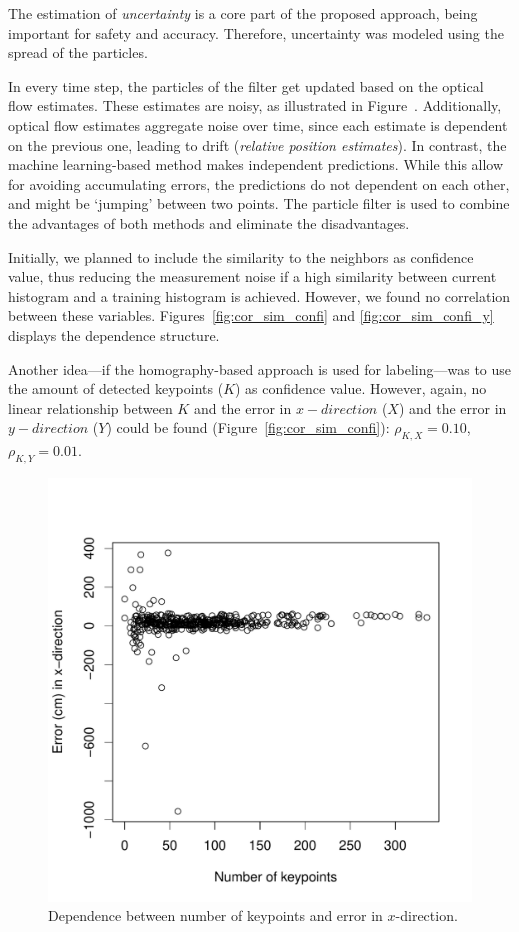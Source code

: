 \documentclass{report}
\begin{document}
The estimation of \emph{uncertainty} is a core part of the proposed
approach, being important for safety and accuracy. Therefore,
uncertainty was modeled using the spread of the particles.

In every time step, the particles of the filter get updated based on
the optical flow estimates. These estimates are noisy, as illustrated
in Figure~. Additionally, optical flow estimates aggregate noise
over time, since each estimate is dependent on the previous one,
leading to drift (\emph{relative position estimates}). In contrast,
the machine learning-based method makes independent predictions. While
this allow for avoiding accumulating errors, the predictions do not
dependent on each other, and might be `jumping' between two
points. The particle filter is used to combine the advantages of both
methods and eliminate the disadvantages.

Initially, we planned to include the similarity to the neighbors as
confidence value, thus reducing the measurement noise if a high
similarity between current histogram and a training histogram is
achieved. However, we found no correlation between these
variables. Figures~\ref{fig:cor_sim_confi} and
\ref{fig:cor_sim_confi_y} displays the dependence structure.

Another idea---if the homography-based approach is used for
labeling---was to use the amount of detected keypoints ($K$) as
confidence value. However, again, no linear relationship between $K$
and the error in $x-direction$ ($X$) and the error in $y-direction$
($Y$) could be found (Figure~\ref{fig:cor_sim_confi}):
$\rho_{K, X} = 0.10$, $\rho_{K, Y} = 0.01$.

\begin{figure}[h!]
\begin{center}
\includegraphics[width=0.448\columnwidth]{keypoints_error_x1}
\caption{{Dependence between number of keypoints and error in $x$-direction.%
}}
\end{center}
\end{figure}
\end{document}
